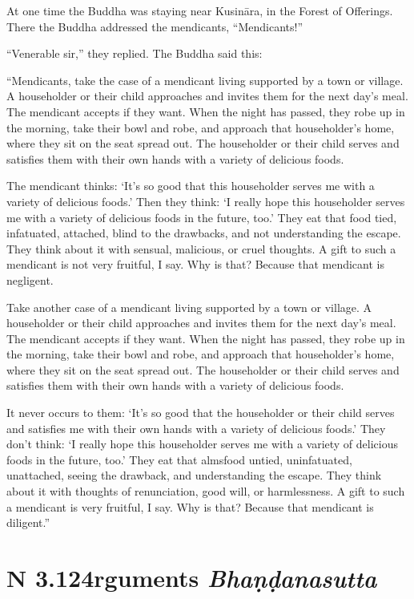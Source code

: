 \documentclass[12pt,openany]{book}%
\newcommand*{\suttatitleacronym}[1]{\smaller[2]{#1}\vspace*{.3em}}
\newcommand*{\suttatitletranslation}[1]{\linebreak{#1}}
\newcommand*{\suttatitleroot}[1]{\linebreak\smaller[2]\itshape{#1}}
\newcommand*{\tocacronym}[1]{\hspace*{-3.3em}{#1}\quad}
\newcommand*{\toctranslation}[1]{#1}
\newcommand*{\tocroot}[1]{(\textit{#1})}
\begin{document}
At one time the Buddha was staying near \textsanskrit{Kusināra}, in the Forest of Offerings. There the Buddha addressed the mendicants, “Mendicants!” 

“Venerable sir,” they replied. The Buddha said this: 

“Mendicants, take the case of a mendicant living supported by a town or village. A householder or their child approaches and invites them for the next day’s meal. The mendicant accepts if they want. When the night has passed, they robe up in the morning, take their bowl and robe, and approach that householder’s home, where they sit on the seat spread out. The householder or their child serves and satisfies them with their own hands with a variety of delicious foods. 

The mendicant thinks: ‘It’s so good that this householder serves me with a variety of delicious foods.’ Then they think: ‘I really hope this householder serves me with a variety of delicious foods in the future, too.’ They eat that food tied, infatuated, attached, blind to the drawbacks, and not understanding the escape. They think about it with sensual, malicious, or cruel thoughts. A gift to such a mendicant is not very fruitful, I say. Why is that? Because that mendicant is negligent. 

Take another case of a mendicant living supported by a town or village. A householder or their child approaches and invites them for the next day’s meal. The mendicant accepts if they want. When the night has passed, they robe up in the morning, take their bowl and robe, and approach that householder’s home, where they sit on the seat spread out. The householder or their child serves and satisfies them with their own hands with a variety of delicious foods. 

It never occurs to them: ‘It’s so good that the householder or their child serves and satisfies me with their own hands with a variety of delicious foods.’ They don’t think: ‘I really hope this householder serves me with a variety of delicious foods in the future, too.’ They eat that almsfood untied, uninfatuated, unattached, seeing the drawback, and understanding the escape. They think about it with thoughts of renunciation, good will, or harmlessness. A gift to such a mendicant is very fruitful, I say. Why is that? Because that mendicant is diligent.” 

%
\section*{{\suttatitleacronym AN 3.124}{\suttatitletranslation Arguments }{\suttatitleroot Bhaṇḍanasutta}}
\addcontentsline{toc}{section}{\tocacronym{AN 3.124} \toctranslation{Arguments } \tocroot{Bhaṇḍanasutta}}
\end{document}
